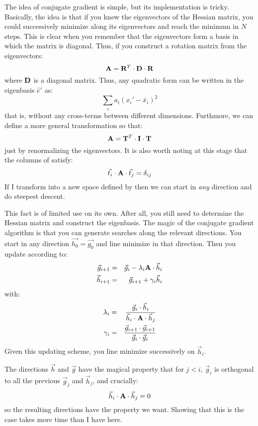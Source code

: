 The idea of conjugate gradient is simple, but its implementation is
tricky. Basically, the idea is that if you knew the eigenvectors of
the Hessian matrix, you could successively minimize along its
eigenvectors and reach the minimum in $N$ steps. This is clear when
you remember that the eigenvectors form a basis in which the matrix is
diagonal. Thus, if you construct a rotation matrix  from the
eigenvectors:
\begin{equation}
{\bf A} = {\bf R}^T \cdot {\bf D} \cdot {\bf R}
\end{equation}
where ${\bf D}$ is a diagonal matrix. Thus, any quadratic form can be
written in the eigenbasis ${\hat e}'$ as:
\begin{equation}
\sum_i a_i (x_i' - {\bar x}_i)^2
\end{equation}
that is, without any cross-terms between different
dimensions. Furthmore, we can define a more general transformation
 so that:
\begin{equation}
{\bf A} = {\bf T}^T \cdot {\bf I} \cdot {\bf T}
\end{equation}
just by renormalizing the eigenvectors. It is also worth noting at
this stage that the columns of  satisfy:
\begin{equation}
\vec{t}_i \cdot{\bf A}\cdot \vec{t}_j = \delta_{ij}
\end{equation}
If I transform into a new space defined by  then we can start
in {\it any} direction and do steepest descent.

This fact is of limited use on its own. After all, you still need to
determine the Hessian matrix and construct the eigenbasis. The magic
of the conjugate gradient algorithm is that you can generate searches
along the relevant directions. You start in any direction
$\vec{h_0}=\vec{g_0}$ and line minimize in that direction. Then you
update according to:
\begin{eqnarray}
\vec{g}_{i+1} &=& \vec{g}_i - \lambda_i {\bf A}\cdot\vec{h}_i \cr
\vec{h}_{i+1} &=& \vec{g}_{i+1} + \gamma_i \vec{h}_i 
\end{eqnarray}
with:
\begin{eqnarray}
\lambda_i &=& \frac{\vec{g}_i \cdot
  \vec{h}_i}{\vec{h}_i\cdot{\bf A}\cdot\vec{h}_j} \cr
\gamma_i &=& \frac{\vec{g}_{i+1} \cdot
  \vec{g}_{i+1}}{\vec{g}_i\cdot\vec{g}_i}
\end{eqnarray}
Given this updating scheme, you line minimize successively on
$\vec{h}_i$. 

The directions $\vec{h}$ and $\vec{g}$ have the magical
property that for $j<i$, $\vec{g}_i$ is orthogonal to all the previous
$\vec{g}_j$ and $\vec{h}_j$, and crucially:
\begin{equation}
\vec{h}_i \cdot {\bf A} \cdot \vec{h}_j = 0 
\end{equation}
so the resulting directions have the property we want. Showing that
this is the case takes more time than I have here. 

